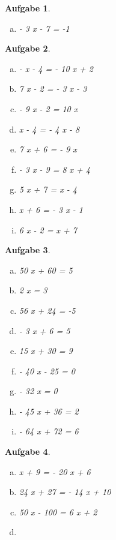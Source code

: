 \documentclass[12pt,fleqn]{article}
\theoremstyle{aufg}
\newtheorem{aufgabe}{Aufgabe}
\theoremstyle{bsp}
\begin{document}
\begin{flushleft}
\begin{aufgabe}
\begin{multicols}{3}
\begin{enumerate}[a)]
\item 
- 3 x - 7 = -1
\end{enumerate} 
\end{multicols} 
\end{aufgabe} 
\begin{aufgabe} ~ \\ 
\begin{multicols}{3} 
\begin{enumerate}[a)] 
\item 
- x - 4 = - 10 x + 2
\item 
7 x - 2 = - 3 x - 3
\item 
- 9 x - 2 = 10 x
\item 
x - 4 = - 4 x - 8
\item 
7 x + 6 = - 9 x
\item 
- 3 x - 9 = 8 x + 4
\item 
5 x + 7 = x - 4
\item 
x + 6 = - 3 x - 1
\item 
6 x - 2 = x + 7
\end{enumerate} 
\end{multicols} 
\end{aufgabe} 
\begin{aufgabe} ~ \\ 
\begin{multicols}{3} 
\begin{enumerate}[a)] 
\item 
50 x + 60 = 5
\item 
2 x = 3
\item 
56 x + 24 = -5
\item 
- 3 x + 6 = 5
\item 
15 x + 30 = 9
\item 
- 40 x - 25 = 0
\item 
- 32 x = 0
\item 
- 45 x + 36 = 2
\item 
- 64 x + 72 = 6
\end{enumerate} 
\end{multicols} 
\end{aufgabe} 
\begin{aufgabe} ~ \\ 
\begin{multicols}{3} 
\begin{enumerate}[a)] 
\item 
x + 9 = - 20 x + 6
\item 
24 x + 27 = - 14 x + 10
\item 
50 x - 100 = 6 x + 2
\item 

\end{enumerate}
\end{multicols}
\end{aufgabe}
\end{flushleft}
\end{document}

